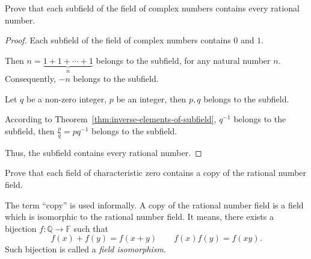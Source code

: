 \begin{exercise}
	Prove that each subfield of the field of complex numbers contains every rational number.
\end{exercise}

\begin{proof}
	Each subfield of the field of complex numbers contains $0$ and $1$.

	Then $n = \underbrace{1 + 1 + \cdots + 1}_{n}$ belongs to the subfield, for any natural number $n$. Consequently, $-n$ belongs to the subfield.

	Let $q$ be a non-zero integer, $p$ be an integer, then $p, q$ belongs to the subfield.

	According to Theorem~\ref{thm:inverse-elements-of-subfield}, $q^{-1}$ belongs to the subfield, then $\frac{p}{q} = pq^{-1}$ belongs to the subfield.

	Thus, the subfield contains every rational number.
\end{proof}

\begin{exercise}
	Prove that each field of characteristic zero contains a copy of the rational number field.
\end{exercise}

\begin{note}
	The term ``copy'' is used informally. A copy of the rational number field is a field which is isomorphic to the rational number field. It means, there exists a bijection $f: \mathbb{Q}\to\mathbb{F}$ such that
	\[
		f(x) + f(y) = f(x + y)\qquad f(x)f(y) = f(xy).
	\]
	Such bijection is called a \textit{field isomorphism}.
\end{note}

